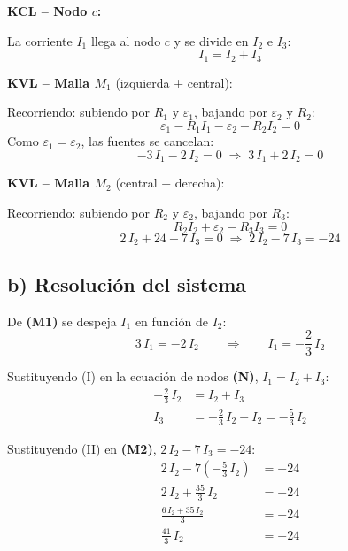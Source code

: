 \documentclass[12pt,letterpaper]{article}
\begin{document}
\hfill
\begin{minipage}[t]{0.56\textwidth}
\vspace{6pt}

\textbf{KCL -- Nodo $c$:}

La corriente $I_1$ llega al nodo $c$ y se divide en $I_2$ e $I_3$:
\[
    \boxed{I_1 = I_2 + I_3} \tag{N}
\]

\medskip
\textbf{KVL -- Malla $M_1$} (izquierda + central):

Recorriendo: subiendo por $R_1$ y $\varepsilon_1$, bajando por $\varepsilon_2$ y $R_2$:
\[
    \varepsilon_1 - R_1 I_1 - \varepsilon_2 - R_2 I_2 = 0
\]
Como $\varepsilon_1 = \varepsilon_2$, las fuentes se cancelan:
\[
    \boxed{-3\,I_1 - 2\,I_2 = 0 \;\Rightarrow\; 3\,I_1 + 2\,I_2 = 0} \tag{M1}
\]

\medskip
\textbf{KVL -- Malla $M_2$} (central + derecha):

Recorriendo: subiendo por $R_2$ y $\varepsilon_2$, bajando por $R_3$:
\[
    R_2 I_2 + \varepsilon_2 - R_3 I_3 = 0
\]
\[
    \boxed{2\,I_2 + 24 - 7\,I_3 = 0 \;\Rightarrow\; 2\,I_2 - 7\,I_3 = -24} \tag{M2}
\]
\end{minipage}

\newpage

\subsection*{b) Resoluci\'on del sistema}

De \textbf{(M1)} se despeja $I_1$ en funci\'on de $I_2$:
\[
    3\,I_1 = -2\,I_2 \qquad\Rightarrow\qquad I_1 = -\frac{2}{3}\,I_2 \tag{I}
\]

Sustituyendo (I) en la ecuaci\'on de nodos \textbf{(N)}, $I_1 = I_2 + I_3$:
\begin{align*}
    -\frac{2}{3}\,I_2 &= I_2 + I_3 \\[4pt]
    I_3 &= -\frac{2}{3}\,I_2 - I_2 = -\frac{5}{3}\,I_2 \tag{II}
\end{align*}

Sustituyendo (II) en \textbf{(M2)}, $2\,I_2 - 7\,I_3 = -24$:
\begin{align*}
    2\,I_2 - 7\left(-\frac{5}{3}\,I_2\right) &= -24 \\[4pt]
    2\,I_2 + \frac{35}{3}\,I_2 &= -24 \\[4pt]
    \frac{6\,I_2 + 35\,I_2}{3} &= -24 \\[4pt]
    \frac{41}{3}\,I_2 &= -24
\end{align*}
\end{document}
